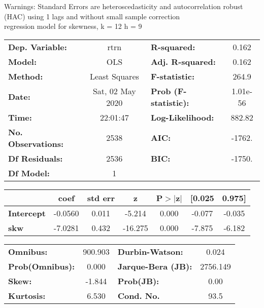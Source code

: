 Warnings: \newline
 [1] Standard Errors are heteroscedasticity and autocorrelation robust (HAC) using 1 lags and without small sample correction\\ 

regression model for skewness, k = 12 h = 9\begin{center}
\begin{tabular}{lclc}
\toprule
\textbf{Dep. Variable:}    &       rtrn       & \textbf{  R-squared:         } &     0.162   \\
\textbf{Model:}            &       OLS        & \textbf{  Adj. R-squared:    } &     0.162   \\
\textbf{Method:}           &  Least Squares   & \textbf{  F-statistic:       } &     264.9   \\
\textbf{Date:}             & Sat, 02 May 2020 & \textbf{  Prob (F-statistic):} &  1.01e-56   \\
\textbf{Time:}             &     22:01:47     & \textbf{  Log-Likelihood:    } &    882.82   \\
\textbf{No. Observations:} &        2538      & \textbf{  AIC:               } &    -1762.   \\
\textbf{Df Residuals:}     &        2536      & \textbf{  BIC:               } &    -1750.   \\
\textbf{Df Model:}         &           1      & \textbf{                     } &             \\
\bottomrule
\end{tabular}
\begin{tabular}{lcccccc}
                   & \textbf{coef} & \textbf{std err} & \textbf{z} & \textbf{P$> |$z$|$} & \textbf{[0.025} & \textbf{0.975]}  \\
\midrule
\textbf{Intercept} &      -0.0560  &        0.011     &    -5.214  &         0.000        &       -0.077    &       -0.035     \\
\textbf{skw}       &      -7.0281  &        0.432     &   -16.275  &         0.000        &       -7.875    &       -6.182     \\
\bottomrule
\end{tabular}
\begin{tabular}{lclc}
\textbf{Omnibus:}       & 900.903 & \textbf{  Durbin-Watson:     } &    0.024  \\
\textbf{Prob(Omnibus):} &   0.000 & \textbf{  Jarque-Bera (JB):  } & 2756.149  \\
\textbf{Skew:}          &  -1.844 & \textbf{  Prob(JB):          } &     0.00  \\
\textbf{Kurtosis:}      &   6.530 & \textbf{  Cond. No.          } &     93.5  \\
\bottomrule
\end{tabular}
\end{center}

